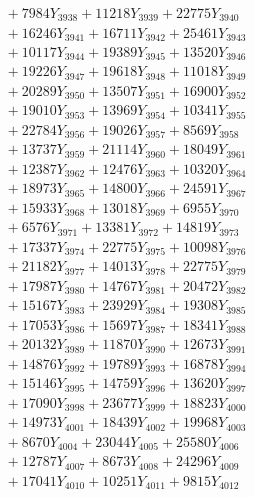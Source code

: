 \documentclass[a4paper,10pt]{article}
\begin{document}
{\begin{align}
&\;  + 7984 Y_{3938} + 11218 Y_{3939} + 22775 Y_{3940} \\[0.3ex]
&\;  + 16246 Y_{3941} + 16711 Y_{3942} + 25461 Y_{3943} \\[0.3ex]
&\;  + 10117 Y_{3944} + 19389 Y_{3945} + 13520 Y_{3946} \\[0.3ex]
&\;  + 19226 Y_{3947} + 19618 Y_{3948} + 11018 Y_{3949} \\[0.3ex]
&\;  + 20289 Y_{3950} + 13507 Y_{3951} + 16900 Y_{3952} \\[0.3ex]
&\;  + 19010 Y_{3953} + 13969 Y_{3954} + 10341 Y_{3955} \\[0.3ex]
&\;  + 22784 Y_{3956} + 19026 Y_{3957} + 8569 Y_{3958} \\[0.5ex]\allowbreak
&\;  + 13737 Y_{3959} + 21114 Y_{3960} + 18049 Y_{3961} \\[0.3ex]
&\;  + 12387 Y_{3962} + 12476 Y_{3963} + 10320 Y_{3964} \\[0.3ex]
&\;  + 18973 Y_{3965} + 14800 Y_{3966} + 24591 Y_{3967} \\[0.3ex]
&\;  + 15933 Y_{3968} + 13018 Y_{3969} + 6955 Y_{3970} \\[0.3ex]
&\;  + 6576 Y_{3971} + 13381 Y_{3972} + 14819 Y_{3973} \\[0.3ex]
&\;  + 17337 Y_{3974} + 22775 Y_{3975} + 10098 Y_{3976} \\[0.3ex]
&\;  + 21182 Y_{3977} + 14013 Y_{3978} + 22775 Y_{3979} \\[0.3ex]
&\;  + 17987 Y_{3980} + 14767 Y_{3981} + 20472 Y_{3982} \\[0.3ex]
&\;  + 15167 Y_{3983} + 23929 Y_{3984} + 19308 Y_{3985} \\[0.3ex]
&\;  + 17053 Y_{3986} + 15697 Y_{3987} + 18341 Y_{3988} \\[0.5ex]\allowbreak
&\;  + 20132 Y_{3989} + 11870 Y_{3990} + 12673 Y_{3991} \\[0.3ex]
&\;  + 14876 Y_{3992} + 19789 Y_{3993} + 16878 Y_{3994} \\[0.3ex]
&\;  + 15146 Y_{3995} + 14759 Y_{3996} + 13620 Y_{3997} \\[0.3ex]
&\;  + 17090 Y_{3998} + 23677 Y_{3999} + 18823 Y_{4000} \\[0.3ex]
&\;  + 14973 Y_{4001} + 18439 Y_{4002} + 19968 Y_{4003} \\[0.3ex]
&\;  + 8670 Y_{4004} + 23044 Y_{4005} + 25580 Y_{4006} \\[0.3ex]
&\;  + 12787 Y_{4007} + 8673 Y_{4008} + 24296 Y_{4009} \\[0.3ex]
&\;  + 17041 Y_{4010} + 10251 Y_{4011} + 9815 Y_{4012} \\[0.3ex]

\end{align}}
\end{document}
